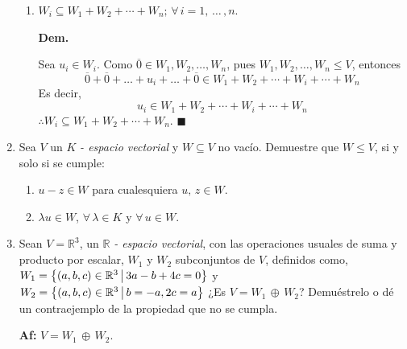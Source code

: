 \documentclass[fleqn]{article}
\begin{document}
\begin{enumerate}
\begin{enumerate}
            \item $ W_i \subseteq W_1 + W_2 + \cdots + W_n; \, \forall \, i = 1,  \, \ldots \, , n $. \par
            \hspace{2.7mm} \textbf{Dem.} \par

            Sea $ u_i \in W_i $. Como $ \overline{0} \in W_1, W_2, \ldots, W_n $, pues $ W_1, W_2, \ldots, W_n \leq V $, entonces
            \begin{equation*}
                \overline{0} + \overline{0} + \ldots + u_i + \ldots + \overline{0} \in W_1 + W_2 + \cdots + W_i + \cdots + W_n
            \end{equation*}
            Es decir,
            \begin{equation*}
                u_i \in W_1 + W_2 + \cdots + W_i + \cdots + W_n
            \end{equation*}
            $ \therefore W_i \subseteq W_1 + W_2 + \cdots + W_n $. $ \blacksquare $
        \end{enumerate}
        
        \item Sea $ V $ un $ K $ \textsl{- espacio vectorial} y $ W \subseteq V $ no vacío. Demuestre que $ W \leq V $, si y solo si se cumple:
        
        \begin{enumerate}
            \item $ u - z \in W $ para cualesquiera $ u, \, z \in W $.
            
            \item $ \lambda u \in W $, $ \forall \, \lambda \in K $ y $ \forall \, u \in W $.
        \end{enumerate}

        \item Sean $ V = \mathbb{R}^3 $, un $ \mathbb{R} $ \textsl{- espacio vectorial}, con las operaciones usuales de suma y producto por escalar, $ W_1 $ y $ W_2 $ subconjuntos de $ V $, definidos como, $ W_1 = \left \{(a,b,c) \in \mathbb{R}^3 \middle \arrowvert 3a - b + 4c = 0 \right \} $ y $ W_2 = \left \{(a,b,c) \in \mathbb{R}^3 \middle \arrowvert b=-a, 2c=a \right \} $ ¿Es $ V = W_1 \, \oplus \, W_2 $? Demuéstrelo o dé un contraejemplo de la propiedad que no se cumpla.
        
        \normalfont
        \textbf{Af:} $ V = W_1 \, \oplus \, W_2 $. \par


\end{enumerate}
\end{document}

